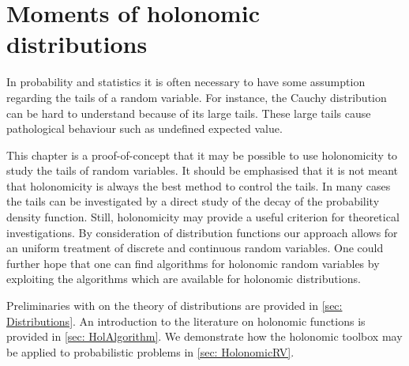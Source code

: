 \chapter{Moments of holonomic distributions}
In probability and statistics it is often necessary to have some assumption regarding the tails of a random variable.
For instance, the Cauchy distribution can be hard to understand because of its large tails.
These large tails cause pathological behaviour such as undefined expected value.

This chapter is a proof-of-concept that it may be possible to use holonomicity to study the tails of random variables.
It should be emphasised that it is not meant that holonomicity is always the best method to control the tails.
In many cases the tails can be investigated by a direct study of the decay of the probability density function.
Still, holonomicity may provide a useful criterion for theoretical investigations.
By consideration of distribution functions our approach allows for an uniform treatment of discrete and continuous random variables.
One could further hope that one can find algorithms for holonomic random variables by exploiting the algorithms which are available for holonomic distributions.

Preliminaries with on the theory of distributions are provided in \cref{sec: Distributions}.
An introduction to the literature on holonomic functions is provided in \cref{sec: HolAlgorithm}.
We demonstrate how the holonomic toolbox may be applied to probabilistic problems in \cref{sec: HolonomicRV}.
